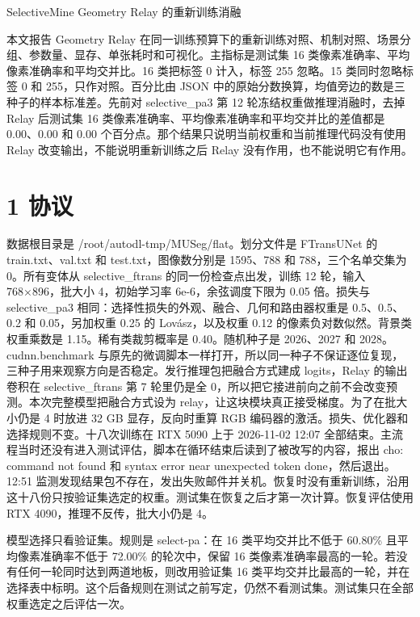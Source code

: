 \documentclass[11pt]{article}
\begin{document}
{\centering\Large SelectiveMine Geometry Relay 的重新训练消融\par}
\vspace{0.6em}
本文报告 Geometry Relay 在同一训练预算下的重新训练对照、机制对照、场景分组、参数量、显存、单张耗时和可视化。主指标是测试集 16 类像素准确率、平均像素准确率和平均交并比。16 类把标签 0 计入，标签 255 忽略。15 类同时忽略标签 0 和 255，只作对照。百分比由 JSON 中的原始分数换算，均值旁边的数是三种子的样本标准差。先前对 selective\_pa3 第 12 轮冻结权重做推理消融时，去掉 Relay 后测试集 16 类像素准确率、平均像素准确率和平均交并比的差值都是 0.00、0.00 和 0.00 个百分点。那个结果只说明当前权重和当前推理代码没有使用 Relay 改变输出，不能说明重新训练之后 Relay 没有作用，也不能说明它有作用。

\section*{1  协议}
数据根目录是 /root/autodl-tmp/MUSeg/flat。划分文件是 FTransUNet 的 train.txt、val.txt 和 test.txt，图像数分别是 1595、788 和 788，三个名单交集为 0。所有变体从 selective\_ftrans 的同一份检查点出发，训练 12 轮，输入 768×896，批大小 4，初始学习率 6e-6，余弦调度下限为 0.05 倍。损失与 selective\_pa3 相同：选择性损失的外观、融合、几何和路由器权重是 0.5、0.5、0.2 和 0.05，另加权重 0.25 的 Lovász，以及权重 0.12 的像素负对数似然。背景类权重乘数是 1.15。稀有类裁剪概率是 0.40。随机种子是 2026、2027 和 2028。cudnn.benchmark 与原先的微调脚本一样打开，所以同一种子不保证逐位复现，三种子用来观察方向是否稳定。发行推理包把融合方式建成 logits，Relay 的输出卷积在 selective\_ftrans 第 7 轮里仍是全 0，所以把它接进前向之前不会改变预测。本次完整模型把融合方式设为 relay，让这块模块真正接受梯度。为了在批大小仍是 4 时放进 32 GB 显存，反向时重算 RGB 编码器的激活。损失、优化器和选择规则不变。十八次训练在 RTX 5090 上于 2026-11-02 12:07 全部结束。主流程当时还没有进入测试评估，脚本在循环结束后读到了被改写的内容，报出 cho: command not found 和 syntax error near unexpected token done，然后退出。12:51 监测发现结果包不存在，发出失败邮件并关机。恢复时没有重新训练，沿用这十八份只按验证集选定的权重。测试集在恢复之后才第一次计算。恢复评估使用 RTX 4090，推理不反传，批大小仍是 4。

模型选择只看验证集。规则是 select-pa：在 16 类平均交并比不低于 60.80\% 且平均像素准确率不低于 72.00\% 的轮次中，保留 16 类像素准确率最高的一轮。若没有任何一轮同时达到两道地板，则改用验证集 16 类平均交并比最高的一轮，并在选择表中标明。这个后备规则在测试之前写定，仍然不看测试集。测试集只在全部权重选定之后评估一次。
\end{document}
